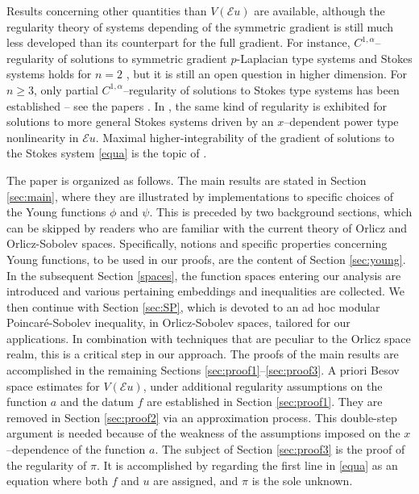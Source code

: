 \documentclass[leqno,11pt]{amsart}%
\numberwithin{equation}{section}
\def\E{\mathcal{E}}
\theoremstyle{definition}
\numberwithin{equation}{section}
\begin{document}
Results concerning other quantities than $V(\E u)$ are available, although the regularity theory of systems depending of the symmetric gradient is still much less developed than its counterpart for the full gradient. For instance, $C^{1,\alpha}$--regularity of solutions to symmetric gradient $p$-Laplacian type systems and Stokes systems holds for $n=2$  \cites{DKS, KMS}, but it is still an open question in higher dimension.
For $n\geq 3$, only partial $C^{1,\alpha}$--regularity  of solutions to Stokes type systems has been established -- see the papers \cites{Breit, BrFu, Fuc, FGR}. In
\cite{AcMi}, the same kind of regularity is exhibited for solutions to more general Stokes systems driven by an $x$--dependent power type nonlinearity  in $\E u$. Maximal higher-integrability of the gradient of solutions to the Stokes system \eqref{equa} is the topic of \cite{DiKa}.


The paper is organized as follows. {The main results are stated in Section \ref{sec:main}, where
 they are illustrated by implementations to specific choices of the Young functions $\phi$ and $\psi$. This is preceded by two background sections, which can be skipped by readers who are familiar with the current theory of Orlicz and Orlicz-Sobolev spaces.
Specifically, notions and  specific properties concerning Young functions, to be used in our proofs, are the content of Section \ref{sec:young}. In the subsequent Section \ref{spaces}, the function spaces entering our analysis are introduced and various pertaining embeddings and inequalities are collected. We then continue with Section \ref{sec:SP},} which is devoted to an ad hoc modular Poincar\'e-Sobolev  inequality, in Orlicz-Sobolev spaces, tailored for our applications. In combination with  techniques that are peculiar
to the Orlicz space realm, this is a critical step in our approach.
 The proofs of the main results are accomplished in the remaining Sections \ref{sec:proof1}--\ref{sec:proof3}. A priori Besov space estimates  for $V(\E u)$, under additional regularity assumptions on the function $a$ and the datum $f$ are established in Section \ref{sec:proof1}. They are removed in Section \ref{sec:proof2} via an approximation process. This double-step argument is needed because of the  weakness of the assumptions imposed on the $x$--dependence of the function $a$. 
 The subject of Section \ref{sec:proof3} is the proof of the regularity of $\pi$. It is accomplished  by regarding the first line in  \eqref{equa} as  an equation where both $f$ and $u$ are assigned, and  $\pi$ is the sole unknown.
\end{document}
